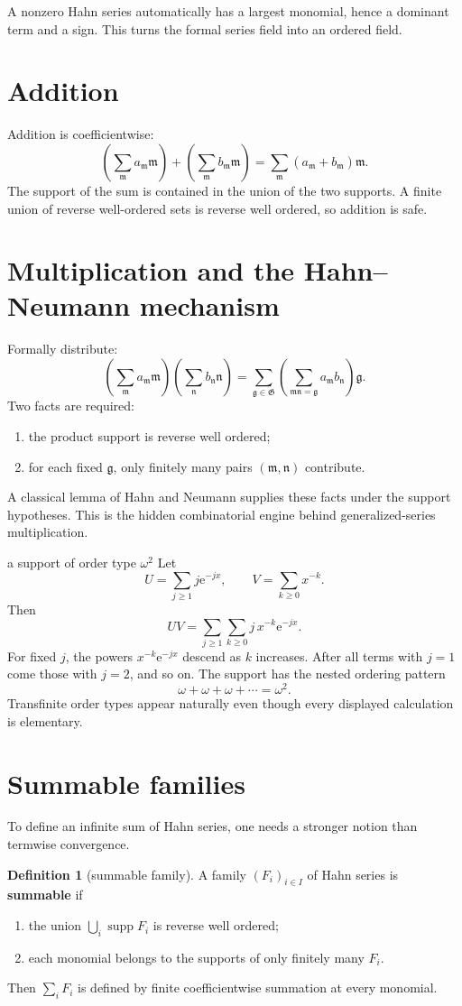 \documentclass[11pt,openany]{book}
\theoremstyle{plain}
\theoremstyle{definition}
\newtheorem{definition}[theorem]{Definition}
\theoremstyle{remark}
\newcommand{\G}{\mathfrak{G}}
\newcommand{\m}{\mathfrak{m}}
\newcommand{\n}{\mathfrak{n}}
\newcommand{\g}{\mathfrak{g}}
\newcommand{\supp}{\operatorname{supp}}
\newcommand{\e}{\mathrm{e}}
\newcommand{\defterm}[1]{\textbf{#1}}
\begin{document}
A nonzero Hahn series automatically has a largest monomial, hence a dominant term and a sign. This turns the formal series field into an ordered field.

\section{Addition}
Addition is coefficientwise:
\[
  \left(\sum_{\m}a_{\m}\m\right)
  +\left(\sum_{\m}b_{\m}\m\right)
  =\sum_{\m}(a_{\m}+b_{\m})\m.
\]
The support of the sum is contained in the union of the two supports. A finite union of reverse well-ordered sets is reverse well ordered, so addition is safe.

\section{Multiplication and the Hahn--Neumann mechanism}
Formally distribute:
\[
  \left(\sum_{\m}a_{\m}\m\right)
  \left(\sum_{\n}b_{\n}\n\right)
  =\sum_{\g\in\G}
    \left(\sum_{\m\n=\g}a_{\m}b_{\n}\right)\g.
\]
Two facts are required:
\begin{enumerate}
\item the product support is reverse well ordered;
\item for each fixed $\g$, only finitely many pairs $(\m,\n)$ contribute.
\end{enumerate}
A classical lemma of Hahn and Neumann supplies these facts under the support hypotheses. This is the hidden combinatorial engine behind generalized-series multiplication.

\begin{workedbox}{a support of order type $\omega^2$}
Let
\[
  U=\sum_{j\ge1}j\e^{-jx},
  \qquad
  V=\sum_{k\ge0}x^{-k}.
\]
Then
\[
  UV=\sum_{j\ge1}\sum_{k\ge0}j\,x^{-k}\e^{-jx}.
\]
For fixed $j$, the powers $x^{-k}\e^{-jx}$ descend as $k$ increases. After all terms with $j=1$ come those with $j=2$, and so on. The support has the nested ordering pattern
\[
  \omega+\omega+\omega+\cdots=\omega^2.
\]
Transfinite order types appear naturally even though every displayed calculation is elementary.
\end{workedbox}

\section{Summable families}
To define an infinite sum of Hahn series, one needs a stronger notion than termwise convergence.

\begin{definition}[summable family]
A family $(F_i)_{i\in I}$ of Hahn series is \defterm{summable} if
\begin{enumerate}
\item the union $\bigcup_i\supp F_i$ is reverse well ordered;
\item each monomial belongs to the supports of only finitely many $F_i$.
\end{enumerate}
Then $\sum_iF_i$ is defined by finite coefficientwise summation at every monomial.
\end{definition}
\end{document}
